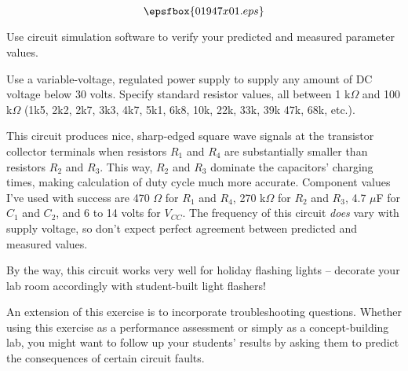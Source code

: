

$$\epsfbox{01947x01.eps}$$

\vfil \eject






Use circuit simulation software to verify your predicted and measured parameter values.







Use a variable-voltage, regulated power supply to supply any amount of DC voltage below 30 volts.  Specify standard resistor values, all between 1 k$\Omega$ and 100 k$\Omega$ (1k5, 2k2, 2k7, 3k3, 4k7, 5k1, 6k8, 10k, 22k, 33k, 39k 47k, 68k, etc.). 

This circuit produces nice, sharp-edged square wave signals at the transistor collector terminals when resistors $R_1$ and $R_4$ are substantially smaller than resistors $R_2$ and $R_3$.  This way, $R_2$ and $R_3$ dominate the capacitors' charging times, making calculation of duty cycle much more accurate.  Component values I've used with success are 470 $\Omega$ for $R_1$ and $R_4$, 270 k$\Omega$ for $R_2$ and $R_3$, 4.7 $\mu$F for $C_1$ and $C_2$, and 6 to 14 volts for $V_{CC}$.  The frequency of this circuit {\it does} vary with supply voltage, so don't expect perfect agreement between predicted and measured values.

By the way, this circuit works very well for holiday flashing lights -- decorate your lab room accordingly with student-built light flashers!

An extension of this exercise is to incorporate troubleshooting questions.  Whether using this exercise as a performance assessment or simply as a concept-building lab, you might want to follow up your students' results by asking them to predict the consequences of certain circuit faults.





